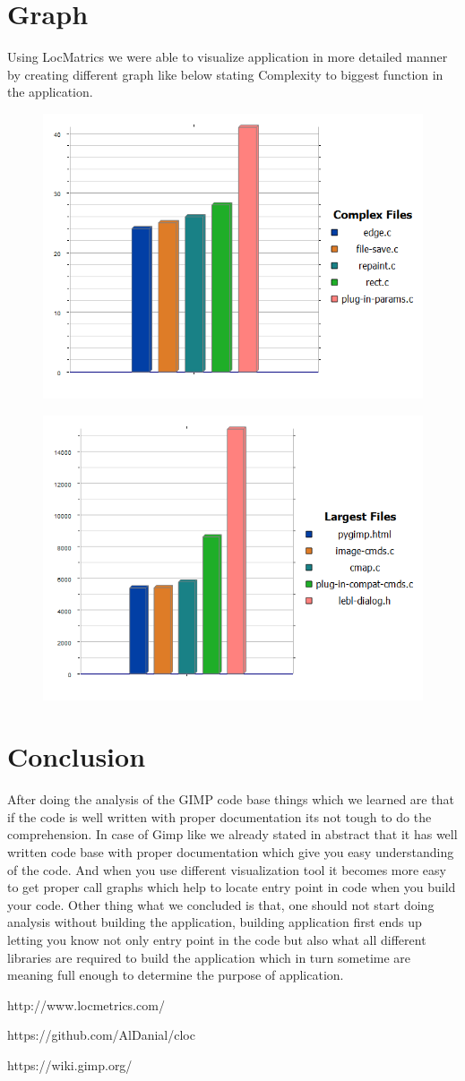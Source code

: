 \section{Graph}
Using LocMatrics we were able to visualize application in more detailed manner by creating different graph like below stating Complexity to biggest function in the application. 
\begin{figure}[h]
	\centering
	\includegraphics[width=0.7\linewidth]{9}
	\caption{}
	\label{fig:9}
\end{figure}
\newpage
\begin{figure}[h]
	\centering
	\includegraphics[width=0.7\linewidth]{6}
	\caption{}
	\label{fig:6}
\end{figure}


\section{Conclusion}
After doing the analysis of the GIMP code base things which we learned are that if the code is well written with proper documentation its not tough to do the comprehension. In case of Gimp like we already stated in abstract that it has well written code base with proper documentation which give you easy understanding of the code. And when you use different visualization tool it becomes more easy to get proper call graphs which help to locate entry point in code when you build your code. Other thing what we concluded is that, one should not start doing analysis without building the application, building application first ends up letting you know not only entry point in the code but also what all different libraries are required to build the application which in turn sometime are meaning full enough to determine the purpose of application.

\newpage
\begin{thebibliography}{9}
	http://www.locmetrics.com/
	
	https://github.com/AlDanial/cloc
	
	https://wiki.gimp.org/
	
	
	
\end{thebibliography}
